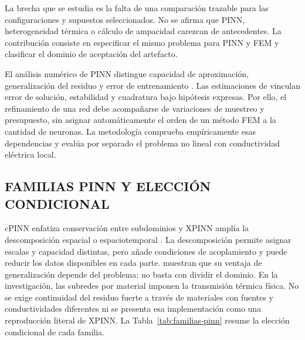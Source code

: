 La brecha que se estudia es la falta de una comparación trazable para las configuraciones y supuestos seleccionados. No se afirma que PINN, heterogeneidad térmica o cálculo de ampacidad carezcan de antecedentes. La contribución consiste en especificar el mismo problema para PINN y FEM y clasificar el dominio de aceptación del artefacto.

El análisis numérico de PINN distingue capacidad de aproximación, generalización del residuo y error de entrenamiento \parencite[24--27]{deryck2024analysis}. Las estimaciones de \textcite[7--8]{mishra2020error} vinculan error de solución, estabilidad y cuadratura bajo hipótesis expresas. Por ello, el refinamiento de una red debe acompañarse de variaciones de muestreo y presupuesto, sin asignar automáticamente el orden de un método FEM a la cantidad de neuronas. La metodología comprueba empíricamente esas dependencias y evalúa por separado el problema no lineal con conductividad eléctrica local.

\subsection{FAMILIAS PINN Y ELECCIÓN CONDICIONAL}

cPINN enfatiza conservación entre subdominios y XPINN amplía la descomposición espacial o espaciotemporal \parencites{jagtap2020cpinn}{jagtap2020xpinn}. La descomposición permite asignar escalas y capacidad distintas, pero añade condiciones de acoplamiento y puede reducir los datos disponibles en cada parte. \textcite{hu2022xpinn} muestran que su ventaja de generalización depende del problema; no basta con dividir el dominio. En la investigación, las subredes por material imponen la transmisión térmica física. No se exige continuidad del residuo fuerte a través de materiales con fuentes y conductividades diferentes ni se presenta esa implementación como una reproducción literal de XPINN. La Tabla~\ref{tab:familias-pinn} resume la elección condicional de cada familia.

